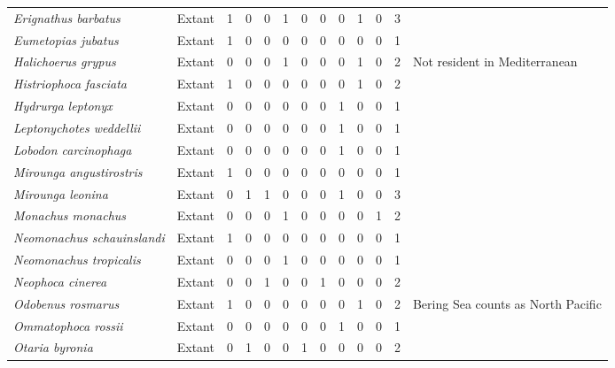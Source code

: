\begin{longtable}{llccccccccccp{}}
\textit{Erignathus barbatus} &
Extant &
1 &
0 &
0 &
1 &
0 &
0 &
0 &
1 &
0 &
3 &
\\

\textit{Eumetopias jubatus} &
Extant &
1 &
0 &
0 &
0 &
0 &
0 &
0 &
0 &
0 &
1 &
\\

\textit{Halichoerus grypus} &
Extant &
0 &
0 &
0 &
1 &
0 &
0 &
0 &
1 &
0 &
2 &
Not resident in Mediterranean\\

\textit{Histriophoca fasciata} &
Extant &
1 &
0 &
0 &
0 &
0 &
0 &
0 &
1 &
0 &
2 &
\\

\textit{Hydrurga leptonyx} &
Extant &
0 &
0 &
0 &
0 &
0 &
0 &
1 &
0 &
0 &
1 &
\\

\textit{Leptonychotes weddellii} &
Extant &
0 &
0 &
0 &
0 &
0 &
0 &
1 &
0 &
0 &
1 &
\\

\textit{Lobodon carcinophaga} &
Extant &
0 &
0 &
0 &
0 &
0 & 
0 &
1 &
0 &
0 &
1 &
\\

\textit{Mirounga angustirostris} &
Extant &
1 &
0 &
0 &
0 &
0 &
0 &
0 &
0 &
0 &
1 &
\\

\textit{Mirounga leonina} &
Extant &
0 &
1 &
1 &
0 &
0 &
0 &
1 &
0 &
0 &
3 &
\\

\textit{Monachus monachus} &
Extant &
0 &
0 &
0 &
1 &
0 &
0 &
0 &
0 &
1 &
2 &
\\

\textit{Neomonachus schauinslandi} &
Extant &
1 &
0 &
0 &
0 &
0 &
0 &
0 &
0 &
0 &
1 &
\\


\textit{Neomonachus tropicalis} &
Extant &
0 &
0 &
0 &
1 &
0 &
0 &
0 &
0 &
0 &
1 &
\\

\textit{Neophoca cinerea} &
Extant &
0 &
0 &
1 &
0 &
0 &
1 &
0 &
0 &
0 &
2 &
\\

\textit{Odobenus rosmarus} &
Extant &
1 &
0 &
0 &
0 &
0 &
0 &
0 &
1 &
0 &
2 &
Bering Sea counts as North Pacific\\

\textit{Ommatophoca rossii} &
Extant &
0 &
0 &
0 &
0 &
0 &
0 &
1 &
0 &
0 &
1 &
\\

\textit{Otaria byronia} &
Extant &
0 &
1 &
0 &
0 &
1 &
0 &
0 &
0 &
0 &
2 &
\\


\end{longtable}

